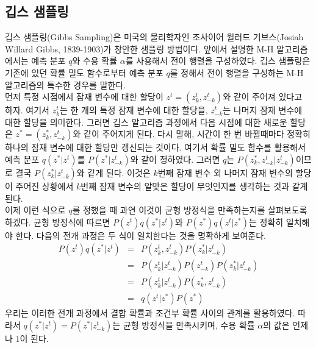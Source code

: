 \documentclass[a4paper]{oblivoir}
\begin{document}
\subsection{깁스 샘플링}

깁스 샘플링(Gibbs Sampling)은 미국의 물리학자인 조사이어 윌러드 기브스(Josiah Willard Gibbs, 1839-1903)가 창안한 샘플링 방법이다. 앞에서 설명한 M-H 알고리즘에서는 예측 분포 $q$와 수용 확률 $\alpha$를 사용해서 전이 행렬을 구성하였다. 깁스 샘플링은 기존에 있던 확률 밀도 함수로부터 예측 분포 $q$를 정해서 전이 행렬을 구성하는 M-H 알고리즘의 특수한 경우를 말한다. \\

먼저 특정 시점에서 잠재 변수에 대한 할당이 $z^{t}=(z^{t}_{k}, z^{t}_{-k})$와 같이 주어져 있다고 하자. 여기서 $z^{t}_{k}$는 한 개의 특정 잠재 변수에 대한 할당을, $z^{t}_{-k}$는 나머지 잠재 변수에 대한 할당을 의미한다. 그러면 깁스 알고리즘 과정에서 다음 시점에 대한 새로운 할당은 $z^{*}=(z^{*}_{k}, z^{t}_{-k})$와 같이 주어지게 된다. 다시 말해, 시간이 한 번 바뀔때마다 정확히 하나의 잠재 변수에 대한 할당만 갱신되는 것이다. 여기서 확률 밀도 함수를 활용해서 예측 분포 $q(z^{*}|z^{t})$를 $P(z^{*}|z^{t}_{-k})$와 같이 정하였다. 그러면 $q$는 $P(z^{*}_{k}, z^{t}_{-k}|z^{t}_{-k})$이므로 결국 $P(z^{*}_{k}|z^{t}_{-k})$와 같게 된다. 이것은 $k$번째 잠재 변수 외 나머지 잠재 변수의 할당이 주어진 상황에서 $k$번째 잠재 변수의 알맞은 할당이 무엇인지를 생각하는 것과 같게 된다. \\

이제 이런 식으로 $q$를 정했을 때 과연 이것이 균형 방정식을 만족하는지를 살펴보도록 하겠다. 균형 방정식에 따르면 $P(z^{t})q(z^{*}|z^{t})$와 $P(z^{*})q(z^{t}|z^{*})$는 정확히 일치해야 한다. 다음의 전개 과정은 두 식이 일치한다는 것을 명확하게 보여준다.   
\begin{eqnarray}
P(z^{t})q(z^{*}|z^{t}) & = & P(z^{t}_{k}, z^{t}_{-k}) P(z^{*}_{k} | z^{t}_{-k}) \nonumber \\
& = & P(z^{t}_{k}| z^{t}_{-k}) P(z^{t}_{-k}) P(z^{*}_{k} | z^{t}_{-k}) \nonumber \\
& = & P(z^{t}_{k}| z^{t}_{-k}) P(z^{*}_{k}, z^{t}_{-k}) \nonumber \\
& = & q(z^{t}|z^{*}) P(z^{*}) \label{eq:10-30}
\end{eqnarray} 
우리는 이러한 전개 과정에서 결합 확률과 조건부 확률 사이의 관계를 활용하였다. 따라서 $q(z^{*}|z^{t}) = P(z^{*}|z^{t}_{-k})$는 균형 방정식을 만족시키며, 수용 확률 $\alpha$의 값은 언제나 $1$이 된다.  \\
\end{document}
